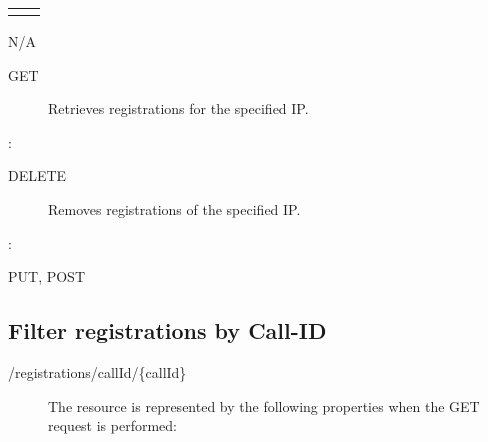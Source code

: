 \documentclass[letterpaper,10pt,english]{sphinxmanual}
\begin{document}
\begin{savenotes}\sphinxattablestart
\centering
\begin{tabulary}{\linewidth}[t]{|T|T|}
\hline

&
\\
\hline&\\
\hline
\end{tabulary}
\par
\sphinxattableend\end{savenotes}

 N/A
\begin{description}
\item[{ GET}] \leavevmode
Retrieves registrations for the specified IP.

\end{description}

:

\begin{sphinxVerbatim}[commandchars=\\\{\}]
\end{sphinxVerbatim}
\begin{description}
\item[{ DELETE}] \leavevmode
Removes registrations of the specified IP.

\end{description}

:

\begin{sphinxVerbatim}[commandchars=\\\{\}]
\end{sphinxVerbatim}

 PUT, POST


\subsection{Filter registrations by Call-ID}
\label{\detokenize{restapi:filter-registrations-by-call-id}}
 /registrations/callId/\{callId\}
\begin{description}
\item[{}] \leavevmode
The resource is represented by the following properties when the GET request is performed:

\end{description}
\end{document}
